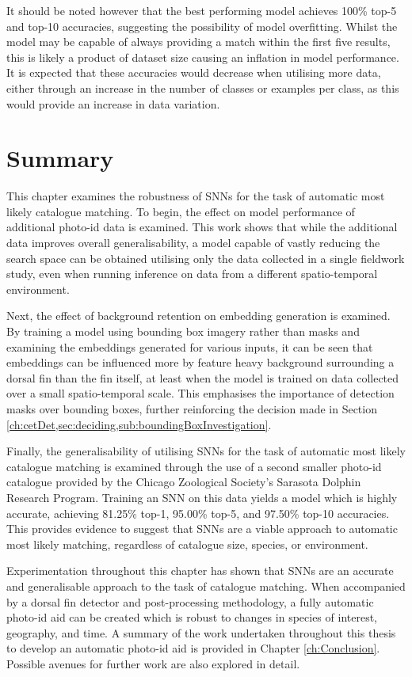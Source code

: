 It should be noted however that the best performing model achieves 100\% top-5 and top-10 accuracies, suggesting the possibility of model overfitting. Whilst the model may be capable of always providing a match within the first five results, this is likely a product of dataset size causing an inflation in model performance. It is expected that these accuracies would decrease when utilising more data, either through an increase in the number of classes or examples per class, as this would provide an increase in data variation.

\section{Summary}\label{ch:SNNEvaluation,sec:Summary}

This chapter examines the robustness of SNNs for the task of automatic most likely catalogue matching. To begin, the effect on model performance of additional photo-id data is examined. This work shows that while the additional data improves overall generalisability, a model capable of vastly reducing the search space can be obtained utilising only the data collected in a single fieldwork study, even when running inference on data from a different spatio-temporal environment.

Next, the effect of background retention on embedding generation is examined. By training a model using bounding box imagery rather than masks and examining the embeddings generated for various inputs, it can be seen that embeddings can be influenced more by feature heavy background surrounding a dorsal fin than the fin itself, at least when the model is trained on data collected over a small spatio-temporal scale. This emphasises the importance of detection masks over bounding boxes, further reinforcing the decision made in Section \ref{ch:cetDet,sec:deciding,sub:boundingBoxInvestigation}.

Finally, the generalisability of utilising SNNs for the task of automatic most likely catalogue matching is examined through the use of a second smaller photo-id catalogue provided by the Chicago Zoological Society's Sarasota Dolphin Research Program. Training an SNN on this data yields a model which is highly accurate, achieving 81.25\% top-1, 95.00\% top-5, and 97.50\% top-10 accuracies. This provides evidence to suggest that SNNs are a viable approach to automatic most likely matching, regardless of catalogue size, species, or environment.

Experimentation throughout this chapter has shown that SNNs are an accurate and generalisable approach to the task of catalogue matching. When accompanied by a dorsal fin detector and post-processing methodology, a fully automatic photo-id aid can be created which is robust to changes in species of interest, geography, and time. A summary of the work undertaken throughout this thesis to develop an automatic photo-id aid is provided in Chapter \ref{ch:Conclusion}. Possible avenues for further work are also explored in detail.
